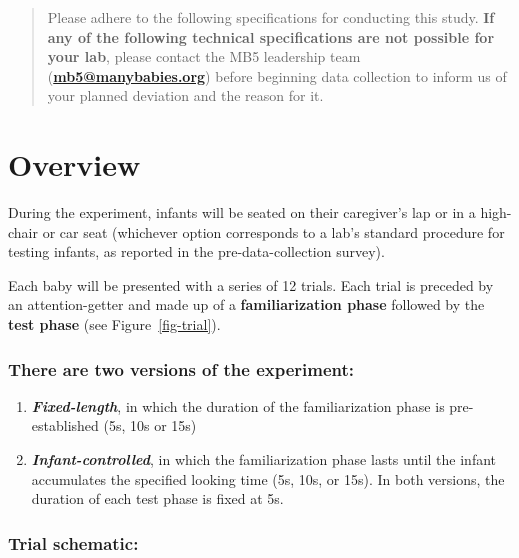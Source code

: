 \documentclass[
  letterpaper,
  DIV=11,
  numbers=noendperiod,
  oneside]{scrreprt}
\providecommand{\tightlist}{%
  \setlength{\itemsep}{0pt}\setlength{\parskip}{0pt}}
\begin{document}
\begin{quote}
Please adhere to the following specifications for conducting this study.
\textbf{If any of the following technical specifications are not
possible for your lab}, please contact the MB5 leadership team
(\href{mailto:mb5@manybabies.org}{\textbf{mb5@manybabies.org}}) before
beginning data collection to inform us of your planned deviation and the
reason for it.
\end{quote}

\section{Overview}\label{overview-2}

During the experiment, infants will be seated on their caregiver's lap
or in a high-chair or car seat (whichever option corresponds to a lab's
standard procedure for testing infants, as reported in the
pre-data-collection survey).

Each baby will be presented with a series of 12 trials. Each trial is
preceded by an attention-getter and made up of a \textbf{familiarization
phase} followed by the \textbf{test phase} (see Figure~\ref{fig-trial}).

\subsubsection[There are two versions of the
experiment:]{\texorpdfstring{There are two versions of the
experiment:}{There are two versions of the experiment:}}\label{there-are-two-versions-of-the-experimentprocedure-1}

\begin{enumerate}
\def\labelenumi{\arabic{enumi}.}
\tightlist
\item
  \textbf{\emph{Fixed-length}}, in which the duration of the
  familiarization phase is pre-established (5s, 10s or 15s)
\item
  \textbf{\emph{Infant-controlled}}, in which the familiarization phase
  lasts until the infant accumulates the specified looking time (5s,
  10s, or 15s). In both versions, the duration of each test phase is
  fixed at 5s.
\end{enumerate}

\subsubsection{Trial schematic:}\label{trial-schematic}
\end{document}
